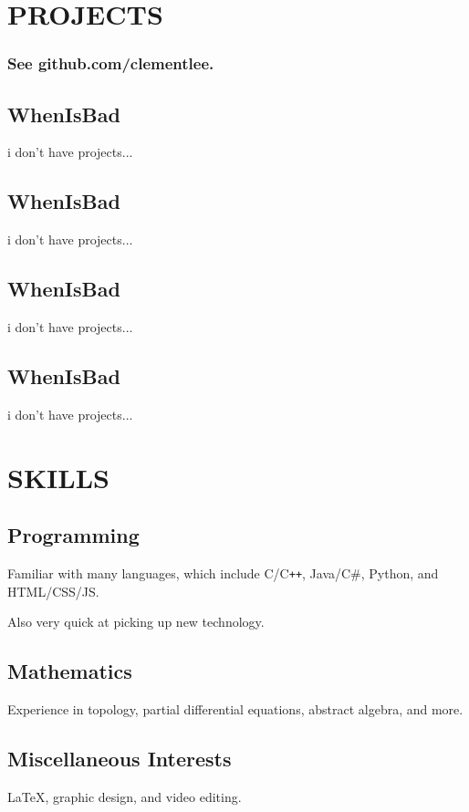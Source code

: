 \documentclass[11pt]{article}
\begin{document}
\begin{multicols}{2}
\section*{PROJECTS}
\vspace{-0.5\baselineskip}
\subsubsection*{See github.com/clementlee.}

\vspace{\baselineskip}
\subsection*{WhenIsBad}
i don't have projects...

\subsection*{WhenIsBad}
i don't have projects...

\subsection*{WhenIsBad}
i don't have projects...

\subsection*{WhenIsBad}
i don't have projects...

\section*{SKILLS}

\subsection*{Programming}
Familiar with many languages, which include C/C{}\verb!++!, Java/C\#, Python, and HTML/CSS/JS.

Also very quick at picking up new technology.

\subsection*{Mathematics}
Experience in topology, partial differential equations, abstract algebra, and more.

\subsection*{Miscellaneous Interests}
LaTeX, graphic design, and video editing.

\end{multicols}
\end{document}
